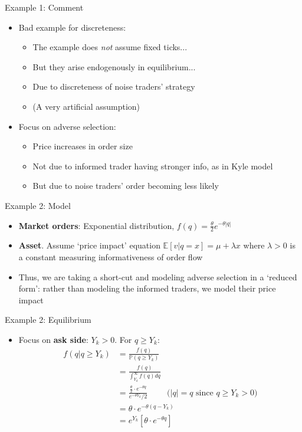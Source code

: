 \documentclass[english,10pt
,aspectratio=169
]{beamer}
\begin{document}
\begin{frame}{Example 1: Comment}
	\begin{itemize}
		\item Bad example for discreteness:
		\begin{itemize}
			\item The example does \emph{not} assume fixed ticks...
			\item But they arise endogenously in equilibrium...
			\item Due to discreteness of noise traders' strategy
			\item (A very artificial assumption)
		\end{itemize}
		\item Focus on adverse selection:
		\begin{itemize}
			\item Price increases in order size
			\item Not due to informed trader having stronger info, as in Kyle model
			\item But due to noise traders' order becoming less likely
		\end{itemize}
	\end{itemize}
\end{frame}


\begin{frame}{Example 2: Model}
	\begin{itemize}
		\item \textbf{Market orders}: Exponential distribution, $f(q)=\frac{\theta}{2} e^{-\theta|q|}$
		\item \textbf{Asset}. Assume `price impact' equation $\mathbb{E}[v|q=x] = \mu + \lambda x$ where $\lambda >0$ is a constant measuring informativeness of order flow
		\item Thus, we are taking a short-cut and modeling adverse selection in a `reduced form': rather than modeling the informed traders, we model their price impact
	\end{itemize}
\end{frame}


\begin{frame}{Example 2: Equilibrium}
	\begin{itemize}
		\item Focus on  \textbf{ask side}: $Y_k>0$. For $q \geq Y_{k}$:
		\begin{align*}
		f(q|q \ge Y_k)&=\frac{f(q)}{ \mathbb{P}(q \geq Y_{k})} \\
		&= \frac{f(q)}{\int^\infty_{Y_k} f(q) dq}\\
		&= \frac{\frac{\theta}{2} \cdot e^{-\theta q}}{e^{-\theta Y_{k}}/2} \quad \quad \text{ ($|q|=q$ since $q \ge Y_k>0$)}\\
		& =\theta \cdot e^{-\theta(q-Y_{k})}\\
		& = e^{Y_k} \left[ \theta \cdot e^{-\theta q} \right]
		\end{align*}
	\end{itemize}
\end{frame}
\end{document}
